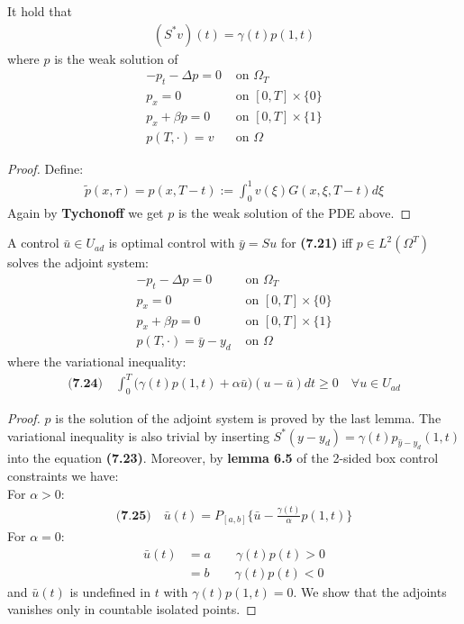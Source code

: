 \begin{lemma}
	It hold that 
	\begin{align*}
		(S^*v)(t) = \gamma(t) p(1, t)
	\end{align*}
	where $p$ is the weak solution of 
	\begin{align*}
		-p_t - \Delta p = 0 &\text{ on } \Omega_T\\
		p_x = 0  &\text{ on } [0, T] \times \{0\}\\
		p_x + \beta p = 0 &\text{ on } [0, T] \times \{1\}\\
		p(T, \cdot) = v &\text{ on } \Omega
	\end{align*}
\end{lemma}
\begin{proof}
	Define:
	\begin{align*}
		\tilde{p}(x, \tau) = p(x, T - t):= \int_0^1 v(\xi) G(x, \xi, T - t) d\xi
	\end{align*}
	Again by \textbf{Tychonoff} we get $p$ is the weak solution of the PDE above. 
\end{proof}



\begin{theorem}
	A control $\bar{u} \in U_{ad}$ is optimal control with $\bar{y} = Su$ for \textbf{(7.21)} iff $p \in L^2(\Omega^T)$ solves the adjoint system:
	\begin{align*}
		-p_t - \Delta p = 0 &\text{ on } \Omega_T\\
		p_x = 0  &\text{ on } [0, T] \times \{0\}\\
		p_x + \beta p = 0 &\text{ on } [0, T] \times \{1\}\\
		p(T, \cdot) = \bar{y} - y_d  &\text{ on } \Omega
	\end{align*}
	where the variational inequality:
	\begin{align*}
	\textbf{(7.24)}\quad
		\int_0^T \bigg( \gamma(t)p(1, t) + \alpha \bar{u}\bigg)( u - \bar{u}) dt \ge 0 \quad \forall u \in U_{ad}
	\end{align*}
\end{theorem}
\begin{proof}
$p$ is the solution of the adjoint system is proved by the last lemma. The variational inequality is also trivial by inserting $S^*(y - y_d) = \gamma(t)p_{\hat{y} - y_d}(1, t)$ into the equation \textbf{(7.23)}. Moreover, by \textbf{lemma 6.5} of the 2-sided box control constraints we have:\\
For $\alpha > 0$:
\begin{align*}
	\textbf{(7.25)}\quad
	\bar{u}(t) = P_{[a, b]} \{ \bar{u}- \frac{\gamma(t)}{\alpha}p(1, t)\}
\end{align*}
For $\alpha = 0$:
\begin{align*}
	\bar{u}(t) &= a \qquad \gamma(t) p(t) > 0\\
	&= b \qquad \gamma(t)p(t) < 0
\end{align*}
and $\bar{u}(t)$ is undefined in $t$ with $\gamma(t) p(1, t) = 0$. We show that the adjoints vanishes only in countable isolated points. 
\end{proof}


